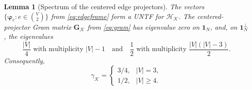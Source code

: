 \documentclass[10pt,a4paper]{amsart}
\newtheorem{lemma}{Lemma}
\begin{document}
\begin{lemma}[Spectrum of the centered edge projectors]\label{edgeframespectrum}
    The vectors $\{\bm\varphi_e : e\in\binom{V}{2}\}$ from \eqref{eq:edgeframe} form a UNTF for $\mathcal H_{\mathcal K}$.
    The centered-projector Gram matrix $\bm G_{\mathcal K}$ from \eqref{eq:gram} has eigenvalue zero on $\bm 1_N$, and, on $\bm 1_N^\perp$, the eigenvalues
    \begin{equation*}
        \frac {|V|}4 \text{ with multiplicity }|V|-1
        \quad\text{and}\quad
        \frac12 \text{ with multiplicity }\frac{|V|(|V|-3)}2.
    \end{equation*}
    Consequently,
    \begin{equation*}
        \gamma_{\mathcal K}
        =\begin{cases}
            3/4,&|V|=3,\\
            1/2,&|V|\ge4.
        \end{cases}
    \end{equation*}
\end{lemma}
\end{document}
